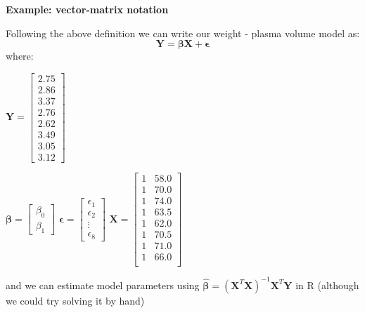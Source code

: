 \documentclass[
]{book}
\theoremstyle{definition}
\theoremstyle{definition}
\theoremstyle{definition}
\theoremstyle{remark}
\begin{document}
\textbf{Example: vector-matrix notation}

Following the above definition we can write our weight - plasma volume model as:
\[\mathbf{Y} = \boldsymbol\beta\mathbf{X} + \boldsymbol\epsilon\]
where:

\(\mathbf{Y}=\begin{bmatrix}  2.75 \\ 2.86 \\ 3.37 \\ 2.76 \\ 2.62 \\ 3.49 \\ 3.05 \\ 3.12 \end{bmatrix}\)

\(\boldsymbol\beta=\begin{bmatrix}  \beta_0 \\  \beta_1 \end{bmatrix}\)
\(\boldsymbol\epsilon=\begin{bmatrix}  \epsilon_1 \\  \epsilon_2 \\  \vdots \\  \epsilon_{8} \end{bmatrix}\)
\(\mathbf{X}=\begin{bmatrix}  1 & 58.0 \\  1 & 70.0 \\  1 & 74.0 \\  1 & 63.5 \\  1 & 62.0 \\  1 & 70.5 \\  1 & 71.0 \\  1 & 66.0 \\ \end{bmatrix}\)

and we can estimate model parameters using \(\hat{\mathbf{\beta}}= (\mathbf{X}^T\mathbf{X})^{-1}\mathbf{X}^T\mathbf{Y}\)
in R (although we could try solving it by hand)
\end{document}
